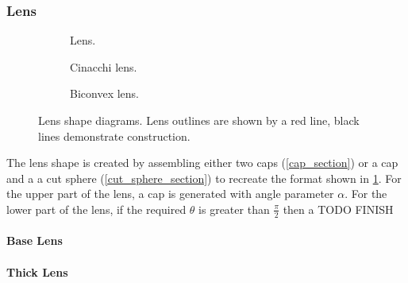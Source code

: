 \subsubsection{Lens}
\begin{figure}
  \begin{center}
    \begin{subfigure}{0.3\textwidth}
      
      \caption{Lens.}
      \label{fig:lens_diagram}
    \end{subfigure}
    \begin{subfigure}{0.3\textwidth}
      
      \caption{Cinacchi lens.}
      \label{fig:cinacchi_lens_diagram}
    \end{subfigure}
    \begin{subfigure}{0.3\textwidth}
      
      \caption{Biconvex lens.}
      \label{fig:biconvex_lens_diagram}
    \end{subfigure}
  \end{center}
  \caption{Lens shape diagrams. Lens outlines are shown by a red line, black lines demonstrate construction.}
  \label{fig:lens_descriptions}
\end{figure}

The lens shape is created by assembling either two caps (\cref{cap_section}) or a cap and a a cut sphere (\cref{cut_sphere_section}) to recreate the format shown in \cref{fig:lens_diagram}. For the upper part of the lens, a cap is generated with angle parameter $\alpha$. For the lower part of the lens, if the required $\theta$ is greater than $\frac{\pi}{2}$ then a TODO FINISH
\paragraph{Base Lens}
\label{base_lens_para}
\paragraph{Thick Lens}

